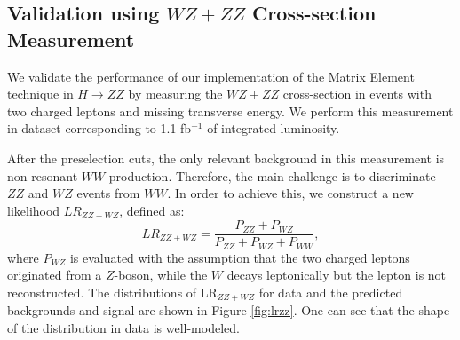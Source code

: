 \documentclass{cmspaper}
\begin{document}
\subsection{Validation using $WZ+ZZ$ Cross-section Measurement}
We validate the performance of our implementation of the Matrix Element technique in $H\rightarrow ZZ$ by measuring
the $WZ+ZZ$ cross-section in events with two charged leptons and missing transverse energy. We perform this measurement
in dataset corresponding to 1.1 fb$^{-1}$ of integrated luminosity.
 
After the preselection cuts, the only relevant background in this measurement is non-resonant $WW$ production.
Therefore, the main challenge is to discriminate $ZZ$ and $WZ$ events from $WW$.
In order to achieve this, we construct a new likelihood $LR_{ZZ+WZ}$, defined as:
\begin{equation}
\label{eqn:LRZZ}
LR_{ZZ+WZ} = \frac { P_{ZZ}+P_{WZ}} { P_{ZZ} + P_{WZ} + P_{WW} },
\end{equation}
where $P_{WZ}$ is evaluated with the assumption that the two charged leptons originated from a $Z$-boson, while 
the $W$ decays leptonically but the lepton is not reconstructed. The distributions of LR$_{ZZ+WZ}$ for data and 
the predicted backgrounds and signal are shown in Figure \ref{fig:lrzz}. One can see that the shape of the distribution
in data is well-modeled.
\end{document}
